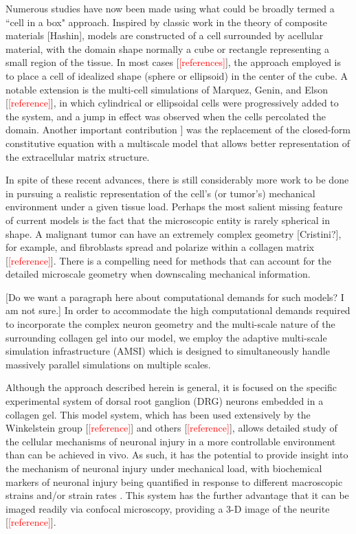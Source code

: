 \documentclass[]{interact}
\newcommand{\red}[1]{\textcolor{red}{[#1]}}
\begin{document}
Numerous studies have now been made using what could be broadly termed a ``cell in a box" approach. Inspired by classic work in the theory of composite materials [Hashin], models are constructed of a cell surrounded by acellular material, with the domain shape normally a cube or rectangle representing a small region of the tissue.  In most cases [\red{references}], the approach employed is to place a cell of idealized shape (sphere or ellipsoid) in the center of the cube. A notable extension is the multi-cell simulations of Marquez, Genin, and Elson [\red{reference}], in which cylindrical or ellipsoidal cells were progressively added to the system, and a jump in effect was observed when the cells percolated the domain.  Another important contribution \citep{Lai:2013fp}] was the replacement of the closed-form constitutive equation with a multiscale model that allows better representation of the extracellular matrix structure.

In spite of these recent advances, there is still considerably more work to be done in pursuing a realistic representation of the cell's (or tumor's) mechanical environment under a given tissue load. Perhaps the most salient missing feature of current models is the fact that the microscopic entity is rarely spherical in shape.  A malignant tumor can have an extremely complex geometry [Cristini?], for example, and fibroblasts spread and polarize within a collagen matrix [\red{reference}]. There is a compelling need for methods that can account for the detailed microscale geometry when downscaling mechanical information.

[Do we want a paragraph here about computational demands for such models? I am not sure.] In order to accommodate the high computational demands required to incorporate the complex neuron geometry and the multi-scale nature of the surrounding collagen gel into our model, we employ the adaptive multi-scale simulation infrastructure (AMSI) \citep{Delalondre:2010kt} which is designed to simultaneously handle massively parallel simulations on multiple scales. 

Although the approach described herein is general, it is focused on the specific experimental system of dorsal root ganglion (DRG) neurons embedded in a collagen gel. This model system, which has been used extensively by the Winkelstein group [\red{reference}] and others [\red{reference}], allows detailed study of the cellular mechanisms of neuronal injury in a more controllable environment than can be achieved in vivo. As such, it has the potential to provide insight into the mechanism of neuronal injury under mechanical load, with biochemical markers of neuronal injury being quantified in response to different macroscopic strains and/or strain rates \citep{Zhang:2016ga}. This system has the further advantage that it can be imaged readily via confocal microscopy, providing a 3-D image of the neurite [\red{reference}].
\end{document}
